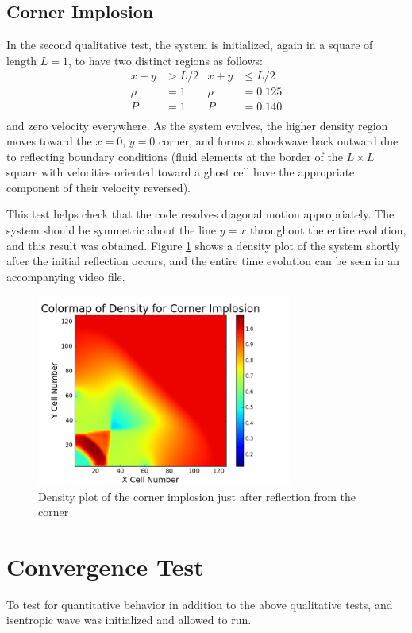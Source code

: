 \documentclass{article}
\begin{document}
\subsection{Corner Implosion}
In the second qualitative test, the system is initialized, again in a square of length $L=1$, to have two distinct regions as follows:
\begin{align*}
    x + y &> L/2 & x+y &\leq L/2 \\
    \rho &= 1 & \rho &= 0.125 \\
    P &= 1 & P &= 0.140 \\
\end{align*}
and zero velocity everywhere. As the system evolves, the higher density region moves toward the $x=0$, $y=0$ corner, and forms a shockwave back outward due to reflecting boundary conditions (fluid elements at the border of the $L \times L$ square with velocities oriented toward a ghost cell have the appropriate component of their velocity reversed). 

This test helps check that the code resolves diagonal motion appropriately. The system should be symmetric about the line $y=x$ throughout the entire evolution, and this result was obtained. Figure \ref{f:ci} shows a density plot of the system shortly after the initial reflection occurs, and the entire time evolution can be seen in an accompanying video file.

 \begin{figure}
     \centering
     \includegraphics[width=0.75\textwidth]{figCI.png}
     \caption{Density plot of the corner implosion just after reflection from the corner}
     \label{f:ci}
 \end{figure}
 
\section{Convergence Test}
To test for quantitative behavior in addition to the above qualitative tests, and isentropic wave was initialized and allowed to run.
\end{document}
